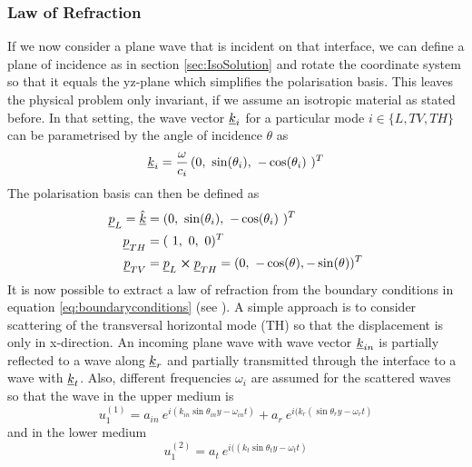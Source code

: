 \subsubsection{Law of Refraction} \label{sec:lawofrefr}
If we now consider a plane wave
that is incident on that interface, we can define a plane of incidence as in
section \ref{sec:IsoSolution} and rotate the
coordinate system so that it equals the yz-plane which simplifies the
polarisation basis. This leaves the physical problem only invariant, if we
assume an isotropic material as stated before.
In that setting, the wave vector $\underline{k}_i$ for a particular mode $i \in
    \{L,TV,TH\}$ can be parametrised by the angle of incidence $\theta$ as
\begin{equation} \label{eq:k_fromangle}
    \uline{k}_i = \frac{\omega}{c_i}\, ( 0,\ \sin(\theta_i),\ -\cos(\theta_i)\
    )^T
\end{equation}
The polarisation basis can then be defined as
\begin{align}
    \uline{p}_L = \uline{\hat{k}} & = ( 0,\ \sin(\theta_i),\ -\cos(\theta_i)\
    )^T
    \\
    \uline{p}_{TH}                & = (\ 1,\ 0,\ 0)^T
    \\
    \uline{p}_{TV}                & = \uline{p}_L \cross \uline{p}_{TH}
    = ( 0,\ -\cos(\theta), -\sin(\theta))^T
\end{align}
It is now possible to extract a law of refraction from the boundary conditions
in equation \ref{eq:boundaryconditions} (see \cite[168ff]{achenbach1973wave}).
A simple approach is to consider
scattering of the transversal horizontal mode (TH) so that the displacement is
only in x-direction. An incoming plane wave with
wave vector $\underline{k}_{in}$ is partially reflected to a wave along
$\underline{k}_r$ and partially transmitted through the interface to a wave with
$\underline{k}_t$. Also, different frequencies $\omega_i$ are assumed for the
scattered waves so that the wave in the upper medium is
\begin{equation}
    u_1^{(1)} = a_{in}\
    e^{i( k_{in}\sin\theta_{in} y-\omega_{in} t)}
    + a_r\ e^{i( k_{r}(\sin\theta_{r} y -\omega_{r} t)}
\end{equation}
and in the lower medium
\begin{equation}
    u_1^{(2)} = a_{t}\
    e^{i(( k_{t}\sin\theta_{t} y -\omega_{t} t)}
\end{equation}
